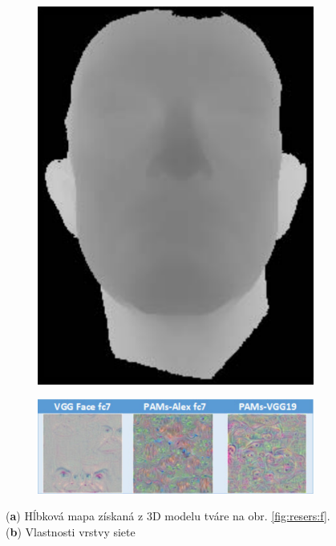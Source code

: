 \begin{figure}[h]
	\centering
	\begin{subfigure}[b]{0.195\textwidth}
		\centering
		\includegraphics[width=\textwidth]{figures/resers_h.png}
		\caption{}
		\label{fig:resers:h}
	\end{subfigure}
	\hfill
	\begin{subfigure}[b]{0.79\textwidth}
		\centering
		\includegraphics[width=\textwidth]{figures/resers_g.png}
		\caption{}
		\label{fig:resers:g}
	\end{subfigure}
	\caption{(\textbf{a}) Hĺbková mapa získaná z 3D modelu tváre na obr. \ref{fig:resers:f}.
	(\textbf{b}) Vlastnosti vrstvy siete } 
	\label{fig:resers:3}
\end{figure}


